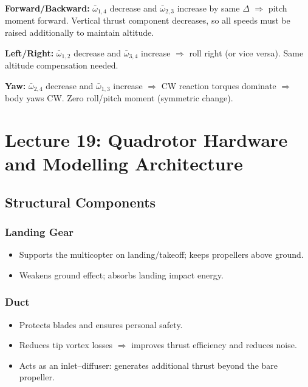 \documentclass[11pt,a4paper]{article}
\begin{document}
\textbf{Forward/Backward:} $\bar\omega_{1,4}$ decrease and $\bar\omega_{2,3}$ increase by same $\Delta$ $\Rightarrow$ pitch moment forward. Vertical thrust component decreases, so all speeds must be raised additionally to maintain altitude.

\textbf{Left/Right:} $\bar\omega_{1,2}$ decrease and $\bar\omega_{3,4}$ increase $\Rightarrow$ roll right (or vice versa). Same altitude compensation needed.

\textbf{Yaw:} $\bar\omega_{2,4}$ decrease and $\bar\omega_{1,3}$ increase $\Rightarrow$ CW reaction torques dominate $\Rightarrow$ body yaws CW. Zero roll/pitch moment (symmetric change).

\newpage
\section{Lecture 19: Quadrotor Hardware and Modelling Architecture}

\subsection{Structural Components}

\subsubsection*{Landing Gear}
\begin{itemize}
  \item Supports the multicopter on landing/takeoff; keeps propellers above ground.
  \item Weakens ground effect; absorbs landing impact energy.
\end{itemize}

\subsubsection*{Duct}
\begin{itemize}
  \item Protects blades and ensures personal safety.
  \item Reduces tip vortex losses $\Rightarrow$ improves thrust efficiency and reduces noise.
  \item Acts as an inlet--diffuser: generates additional thrust beyond the bare propeller.
\end{itemize}
\end{document}
